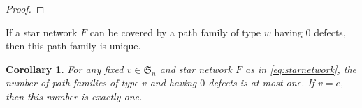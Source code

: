 \documentclass[12pt]{amsart}
\newtheorem{cor}[thm]{Corollary}
\theoremstyle{definition}
\numberwithin{equation}{section}
\newcommand{\sn}{\mathfrak{S}_n}
\newcommand{\src}[2]{\mathrm{src}_{{#1}, {#2}}}
\newcommand{\snk}[2]{\mathrm{snk}_{{#1}, {#2}}}
\newcommand{\ctr}[1]{{x}_{#1}}
\begin{document}
\begin{proof}
\end{proof}

If a star network $F$ can be covered by a path family of type $w$ having 0 defects, then this path family is unique.

\begin{cor}\label{c: unique zero defect-condensed}
    For any fixed $v \in \sn$ and star network $F$ as in \eqref{eq:starnetwork}, 
    the number of path families of type $v$ and having $0$ defects is at most one. If $v = e$, then this number is exactly one.
\end{cor}
\end{document}
